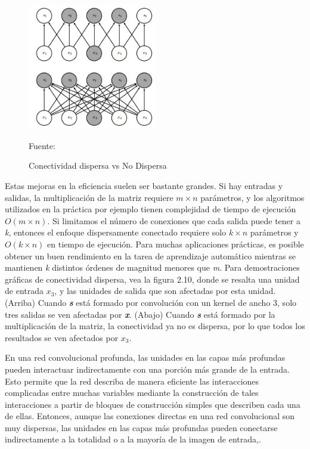 		\begin{figure}[H]
		\begin{center}
		\includegraphics[width=0.5\textwidth]{images/marcoteorico/sparceCon}
		\end{center}
		\begin{center}
		\caption{\footnotesize \small{Conectividad dispersa vs No Dispersa}}
		\vskip -0.3cm  
		{\small{Fuente:\cite{Goodfellow-et-al-2016}}}
		\end{center}
		\vspace{-1.5em}
		\end{figure} 	

		Estas mejoras en la eficiencia suelen ser bastante grandes. Si hay entradas y salidas, la multiplicación de la matriz requiere $m \times n$ parámetros, y los algoritmos utilizados en la práctica por ejemplo tienen complejidad de tiempo de ejecución $O(m \times n)$. Si limitamos el número de conexiones que cada salida puede tener a {\textit k}, entonces el enfoque dispersamente conectado requiere solo $k \times n$ parámetros y $O(k \times n)$ en tiempo de ejecución. Para muchas aplicaciones prácticas, es posible obtener un buen rendimiento en la tarea de aprendizaje automático mientras se mantienen {\textit k} distintos órdenes de magnitud menores que {\textit m}. Para demostraciones gráficas de conectividad dispersa, vea la figura 2.10, donde se resalta una unidad de entrada $x_{3}$, y las unidades de salida que son afectadas por esta unidad. (Arriba) Cuando {\bf {\textit {s}}} está formado por convolución con un kernel de ancho 3, solo tres salidas se ven afectadas por {\bf \textit  x}. (Abajo) Cuando {\bf \textit s} está formado por la multiplicación de la matriz, la conectividad ya no es dispersa, por lo que todos los resultados se ven afectados por $x_{3}$.

		\vskip 0.4cm  
		En una red convolucional profunda, las unidades en las capas más profundas pueden interactuar indirectamente con una porción más grande de la entrada. Esto permite que la red describa de manera eficiente las interacciones complicadas entre muchas variables mediante la construcción de tales interacciones a partir de bloques de construcción simples que describen cada una de ellas. Entonces, aunque las conexiones directas en una red convolucional son muy dispersas, las unidades en las capas más profundas pueden conectarse indirectamente a la totalidad o a la mayoría de la imagen de entrada,\citep{Goodfellow-et-al-2016}.
		
